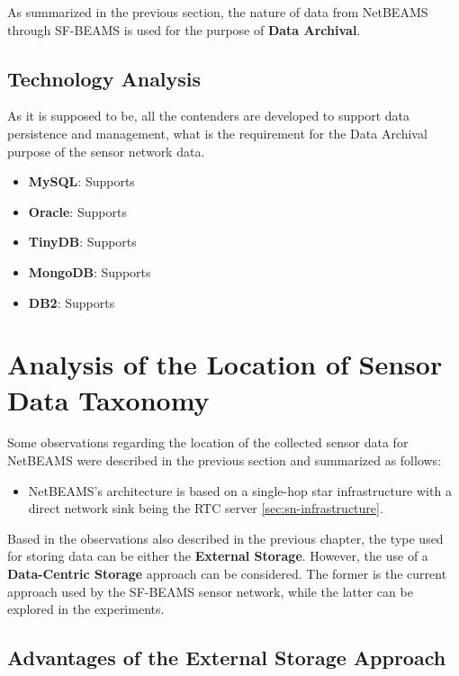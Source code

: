 As summarized in the previous section, the nature of data from NetBEAMS through
SF-BEAMS is used for the purpose of \textbf{Data Archival}.

\subsection{Technology Analysis}

As it is supposed to be, all the contenders are developed to support data
persistence and management, what is the requirement for the Data Archival
purpose of the sensor network data.

\begin{itemize}
  \item \textbf{MySQL}: Supports
  \item \textbf{Oracle}: Supports
  \item \textbf{TinyDB}: Supports
  \item \textbf{MongoDB}: Supports
  \item \textbf{DB2}: Supports
\end{itemize}

\section{Analysis of the Location of Sensor Data Taxonomy}
\label{sec:sn-data-location}

Some observations regarding the location of the collected sensor data for
NetBEAMS were described in the previous section and summarized as follows:

\begin{itemize}
  \item NetBEAMS's architecture is based on a single-hop star infrastructure 
   with a direct network sink being the RTC server \ref{sec:sn-infrastructure}.
\end{itemize}

Based in the observations also described in the previous chapter, the type used
for storing data can be either the \textbf{External Storage}. However, the use
of a \textbf{Data-Centric Storage} approach can be considered. The former is the
current approach used by the SF-BEAMS sensor network, while the latter can be
explored in the experiments.

\subsection{Advantages of the External Storage Approach}

